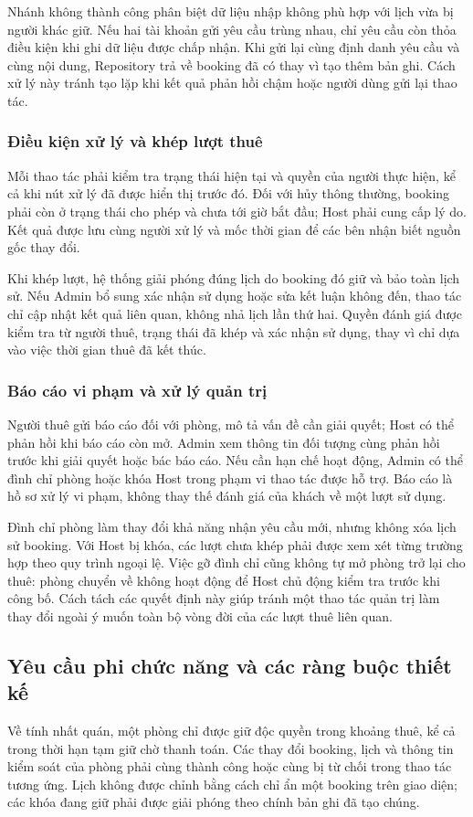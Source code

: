 Nhánh không thành công phân biệt dữ liệu nhập không phù hợp với lịch vừa bị người khác giữ. Nếu hai tài khoản gửi yêu cầu trùng nhau, chỉ yêu cầu còn thỏa điều kiện khi ghi dữ liệu được chấp nhận. Khi gửi lại cùng định danh yêu cầu và cùng nội dung, Repository trả về booking đã có thay vì tạo thêm bản ghi. Cách xử lý này tránh tạo lặp khi kết quả phản hồi chậm hoặc người dùng gửi lại thao tác.

\subsubsection{Điều kiện xử lý và khép lượt thuê}
Mỗi thao tác phải kiểm tra trạng thái hiện tại và quyền của người thực hiện, kể cả khi nút xử lý đã được hiển thị trước đó. Đối với hủy thông thường, booking phải còn ở trạng thái cho phép và chưa tới giờ bắt đầu; Host phải cung cấp lý do. Kết quả được lưu cùng người xử lý và mốc thời gian để các bên nhận biết nguồn gốc thay đổi.

Khi khép lượt, hệ thống giải phóng đúng lịch do booking đó giữ và bảo toàn lịch sử. Nếu Admin bổ sung xác nhận sử dụng hoặc sửa kết luận không đến, thao tác chỉ cập nhật kết quả liên quan, không nhả lịch lần thứ hai. Quyền đánh giá được kiểm tra từ người thuê, trạng thái đã khép và xác nhận sử dụng, thay vì chỉ dựa vào việc thời gian thuê đã kết thúc.

\subsubsection{Báo cáo vi phạm và xử lý quản trị}
Người thuê gửi báo cáo đối với phòng, mô tả vấn đề cần giải quyết; Host có thể phản hồi khi báo cáo còn mở. Admin xem thông tin đối tượng cùng phản hồi trước khi giải quyết hoặc bác báo cáo. Nếu cần hạn chế hoạt động, Admin có thể đình chỉ phòng hoặc khóa Host trong phạm vi thao tác được hỗ trợ. Báo cáo là hồ sơ xử lý vi phạm, không thay thế đánh giá của khách về một lượt sử dụng.

Đình chỉ phòng làm thay đổi khả năng nhận yêu cầu mới, nhưng không xóa lịch sử booking. Với Host bị khóa, các lượt chưa khép phải được xem xét từng trường hợp theo quy trình ngoại lệ. Việc gỡ đình chỉ cũng không tự mở phòng trở lại cho thuê: phòng chuyển về không hoạt động để Host chủ động kiểm tra trước khi công bố. Cách tách các quyết định này giúp tránh một thao tác quản trị làm thay đổi ngoài ý muốn toàn bộ vòng đời của các lượt thuê liên quan.

\subsection{Yêu cầu phi chức năng và các ràng buộc thiết kế}
Về tính nhất quán, một phòng chỉ được giữ độc quyền trong khoảng thuê, kể cả trong thời hạn tạm giữ chờ thanh toán. Các thay đổi booking, lịch và thông tin kiểm soát của phòng phải cùng thành công hoặc cùng bị từ chối trong thao tác tương ứng. Lịch không được chỉnh bằng cách chỉ ẩn một booking trên giao diện; các khóa đang giữ phải được giải phóng theo chính bản ghi đã tạo chúng.

